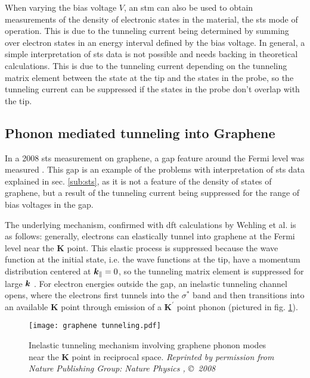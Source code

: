 \documentclass[main.tex]{subfiles}
\begin{document}
When varying the bias voltage \(V\), an \acrshort{stm} can also be used to obtain measurements of the density of electronic states in the material, the \acrfull{sts} mode of operation.
This is due to the tunneling current being determined by summing over electron states in an energy interval defined by the bias voltage.
In general, a simple interpretation of \acrshort{sts} data is not possible and needs backing in theoretical calculations.
This is due to the tunneling current depending on the tunneling matrix element between the state at the tip and the states in the probe, so the tunneling current can be suppressed if the states in the probe don't overlap with the tip.


\subsection{Phonon mediated tunneling into Graphene}\label{sub:tunneling_graphene}

In a 2008 \acrshort{sts} measurement on graphene, a gap feature around the Fermi level was measured \cite{zhang_giant_2008}.
This gap is an example of the problems with interpretation of \acrshort{sts} data explained in sec. \ref{sub:sts}, as it is not a feature of the density of states of graphene, but a result of the tunneling current being suppressed for the range of bias voltages in the gap.

The underlying mechanism, confirmed with \acrshort{dft} calculations by Wehling et al. \cite{wehling_phonon-mediated_2008} is as follows:
generally, electrons can elastically tunnel into graphene at the Fermi level near the \(\boldsymbol{K}\) point.
This elastic process is suppressed because the wave function at the initial state, i.e. the wave functions at the tip, have a momentum distribution centered at \(\vb*{k}_{\parallel} = 0\), so the tunneling matrix element is suppressed for large \(\vb*{k}\) \cite{vitali_phonon_2004}.
For electron energies outside the gap, an inelastic tunneling channel opens, where the electrons first tunnels into the \(\sigma^*\) band and then transitions into an available \(\boldsymbol{K}\) point through emission of a \(\boldsymbol{K}^{\prime}\) point phonon (pictured in fig. \ref{fig:graphene_tunneling}).

\begin{figure}
    \centering
    \texttt{[image: graphene tunneling.pdf]}
    \caption{Inelastic tunneling mechanism involving graphene phonon modes near the \(\boldsymbol{K}\) point in reciprocal space. \emph{Reprinted by permission from Nature Publishing Group: Nature Physics \cite{zhang_giant_2008}, \copyright\, 2008}}
    \label{fig:graphene_tunneling}
\end{figure}
\end{document}
